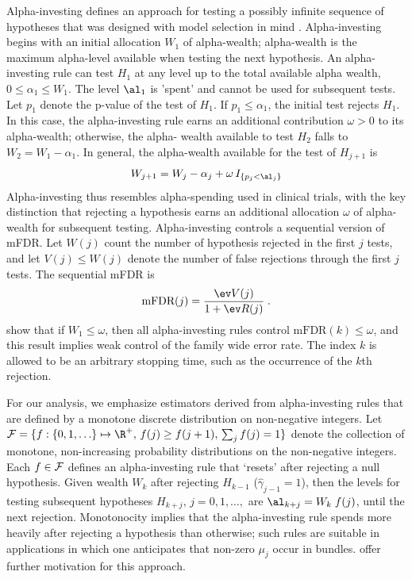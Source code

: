 \documentclass[12pt]{article}
\begin{document}
 Alpha-investing defines an approach for testing a possibly infinite sequence of
 hypotheses that was designed with model selection in mind
 \citep{fosterstine08}.  Alpha-investing begins with an initial allocation $W_1$
 of alpha-wealth; alpha-wealth is the maximum alpha-level available when testing
 the next hypothesis.  An alpha-investing rule can test $H_1$ at any level up to
 the total available alpha wealth, $0 \le \alpha_1 \le W_1$.  The level $\al_1$
 is 'spent' and cannot be used for subsequent tests.  Let $p_1$ denote the
 p-value of the test of $H_1$.  If $p_1 \le \alpha_1$, the initial test rejects
 $H_1$.  In this case, the alpha-investing rule earns an additional contribution
 $\omega > 0$ \marginpar{$\omega$} to its alpha-wealth; otherwise, the alpha-
 wealth available to test $H_2$ falls to $W_2 = W_1 - \alpha_1$.  In general,
 the alpha-wealth available for the test of $H_{j+1}$ is 
 \begin{equation}
    W_{j+1} = W_j - \alpha_j + \omega \, I_{\{p_j < \al_j\}}
 \label{eq:Wj}
 \end{equation}
 Alpha-investing thus resembles alpha-spending used in clinical trials, with the
 key distinction that rejecting a hypothesis earns an additional allocation
 $\omega$ of alpha-wealth for subsequent testing. Alpha-investing controls a sequential version of mFDR.  Let $W(j)$
 count the number of hypothesis rejected in the first $j$ tests, and let $V(j)
 \le W(j)$ denote the number of false rejections through the first $j$ tests.
 The sequential mFDR is
 \begin{equation}
    \mbox{mFDR}(j) = \frac{\ev V(j)}{1+\ev R(j)} \;.
 \label{eq:mFDR}
 \end{equation}
 \citet{fosterstine08} show that if $W_1 \le \omega$, then all alpha-investing
 rules control $\mbox{mFDR}(k) \le \omega$, and this result implies weak control
 of the family wide error rate.  The index $k$ is allowed to be an arbitrary
 stopping time, such as the occurrence of the $k$th rejection.

 
 For our analysis, we emphasize estimators derived from alpha-investing rules
 that are defined by a monotone discrete distribution on non-negative integers.
  Let ${\cal F} = \{f:\{0,1,\ldots\} \mapsto \R^{+}, \, f(j) \ge f(j+1),\,
 \sum_j f(j) = 1\}$ denote the collection of monotone, non-increasing
 probability distributions on the non-negative integers.  Each $f \in {\cal F}$
 defines an alpha-investing rule that `resets' after rejecting a null
 hypothesis.  Given wealth $W_k$ after rejecting $H_{k-1}$
 ($\hat\gamma_{j-1}=1$), then the levels for testing subsequent hypotheses
 $H_{k+j}, \, j=0,1,\ldots,$ are $\al_{k+j} = W_k \; f(j)$, until the next
 rejection.  Monotonocity implies that the alpha-investing rule spends more
 heavily after rejecting a hypothesis than otherwise; such rules are suitable in
 applications in which one anticipates that non-zero $\mu_j$ occur in bundles.
  \citet{fosterstine08} offer further motivation for this approach.
\end{document}
